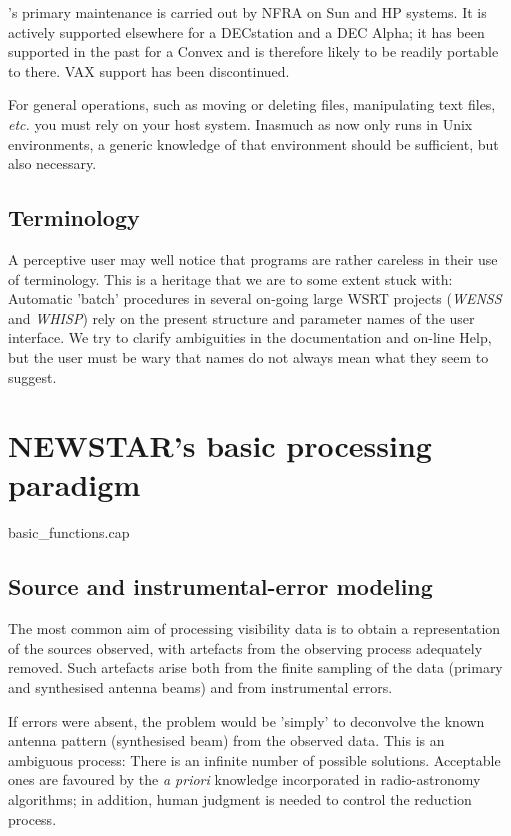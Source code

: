 	\NEWSTAR's primary maintenance is carried out by NFRA on Sun and HP
systems. It is actively supported elsewhere for a DECstation and a DEC Alpha;
it has been supported in the past for a Convex and is therefore likely to be
readily portable to there. VAX support has been discontinued.

	For general operations, such as moving or deleting files, manipulating
text files, {\em etc.} you must rely on your host system. Inasmuch as \NEWSTAR
now only runs in Unix environments, a generic knowledge of that environment
should be sufficient, but also necessary.


\subsection{ Terminology}
\label{.terminology}

	A perceptive user may well notice that \NEWSTAR programs are rather
careless in their use of terminology. This is a heritage that we are to some
extent stuck with: Automatic 'batch' procedures in several on-going large WSRT
projects ({\em WENSS} and {\em WHISP}) rely on the present structure and
parameter names of the user interface. We try to clarify ambiguities in the
documentation and on-line Help, but the user must be wary that names do not
always mean what they seem to suggest.


\section{ NEWSTAR's basic processing paradigm }
\label{.basic}

 {basic_functions.cap}

\subsection{ Source and instrumental-error modeling }
\label{.source.error.modeling}

	The most common aim of processing visibility data is to obtain a
representation of the sources observed, with artefacts from the observing
process adequately removed. Such artefacts arise both from the finite sampling
of the data (primary and synthesised antenna beams) and from instrumental
errors.

	If errors were absent, the problem would be 'simply' to deconvolve the
known antenna pattern (synthesised beam) from the observed data. This is an
ambiguous process: There is an infinite number of possible solutions.
Acceptable ones are favoured by the {\em a priori} knowledge incorporated in
radio-astronomy algorithms; in addition, human judgment is needed to control
the reduction process.

